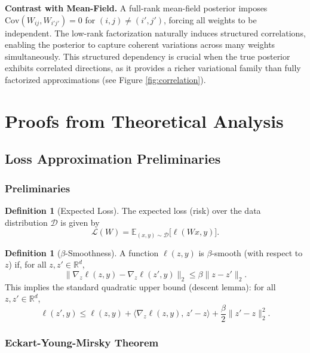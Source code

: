 \documentclass{article}
\theoremstyle{plain}
\theoremstyle{definition}
\newtheorem{definition}[theorem]{Definition}
\theoremstyle{remark}
\begin{document}
\textbf{Contrast with Mean-Field.} A full-rank mean-field posterior imposes $\mathrm{Cov}(W_{ij}, W_{i'j'}) = 0$ for $(i,j) \neq (i',j')$, forcing all weights to be independent. The low-rank factorization naturally induces structured correlations, enabling the posterior to capture coherent variations across many weights simultaneously. This structured dependency is crucial when the true posterior exhibits correlated directions, as it provides a richer variational family than fully factorized approximations (see Figure \ref{fig:correlation}).


\section{Proofs from Theoretical Analysis}\label{app:theory_proofs}

\subsection{Loss Approximation Preliminaries}\label{app:loss_bounds}

\subsubsection{Preliminaries}\label{app:loss_bounds:prelim}

\begin{definition}[Expected Loss]
\label{def:expected_loss}
The expected loss (risk) over the data distribution $\mathcal{D}$ is given by
\[
\mathcal{L}(W) = \mathbb{E}_{(x, y) \sim \mathcal{D}} \big[ \ell(Wx, y) \big].
\]
\end{definition}

\begin{definition}[$\beta$-Smoothness]
\label{def:smoothness}
A function $\ell(z,y)$ is $\beta$-smooth (with respect to $z$) if, for all $z,z'\in\mathbb{R}^d$,
\[
\bigl\|\nabla_z \ell(z,y)-\nabla_z \ell(z',y)\bigr\|_2 \leq \beta \|z-z'\|_2.
\]
This implies the standard quadratic upper bound (descent lemma): for all $z,z'\in\mathbb{R}^d$,
\[
\ell(z',y)\le \ell(z,y)+\langle \nabla_z \ell(z,y),\,z'-z\rangle + \frac{\beta}{2}\|z'-z\|_2^2.
\]
\end{definition}

\subsubsection{Eckart-Young-Mirsky Theorem}\label{app:approx:eym}
\end{document}
